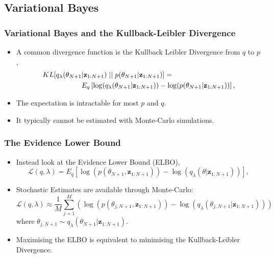 \documentclass[11pt]{beamer}\usepackage[]{graphicx}\usepackage[]{color}
\begin{document}
\begin{frame}
\subsection{Variational Bayes}
\frametitle{Variational Bayes and the Kullback-Leibler Divergence}
\begin{itemize}
\item A common divergence function is the Kullback Leibler Divergence from $q$ to $p$,
\begin{align}
\label{KL-def}
KL[q_{\lambda}(\theta_{N+1} &| \textbf{z}_{1:N+1})\hspace{.1cm}||\hspace{.1cm}p(\theta_{N+1} | \textbf{z}_{1:N+1})] = \nonumber \\
&E_q \left[ \log(q_{\lambda}(\theta_{N+1} | \textbf{z}_{1:N+1})) - \log(p(\theta_{N+1} | \textbf{z}_{1:N+1})) \right],
\end{align}
\item The expectation is intractable for most $p$ and $q$.
\item It typically cannot be estimated with Monte-Carlo simulations.
\end{itemize}
\end{frame}

\begin{frame}
\frametitle{The Evidence Lower Bound}
\begin{itemize}
\item Instead look at the Evidence Lower Bound (ELBO), 
\begin{equation}
\label{ELBO}
\mathcal{L}(q, \lambda) = E_{q} \left[\log(p(\theta_{N+1}, \textbf{z}_{1:N+1})) - \log(q_{\lambda}(\theta | \textbf{z}_{1:N+1}))\right],
\end{equation}
\item Stochastic Estimates are available through Monte-Carlo: $$\mathcal{L}(q, \lambda) \approx \frac{1}{M} \sum_{j=1}^M \left(\log(p(\theta_{j, N+1}, \textbf{z}_{1:N+1})) - \log(q_{\lambda}(\theta_{j, N+1} | \textbf{z}_{1:N+1})) \right)$$ where $\theta_{j, N+1} \sim q_{\lambda}(\theta_{N+1} | \textbf{z}_{1:N+1})$.
\item Maximising the ELBO is equivalent to minimising the Kullback-Leibler Divergence.
\end{itemize}
\end{frame}
\end{document}
